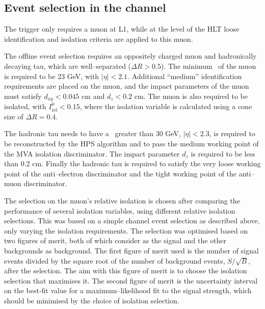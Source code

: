 \subsection{\texorpdfstring{Event selection in the \mutau channel}{Event selection in the mu tau channel}}
\label{sec:mssm_eventsel_mt}
The trigger only requires a muon at \ac{L1}, while at the level of the \ac{HLT}
loose identification and isolation criteria are applied to this muon.

The offline event selection requires an oppositely charged
muon and hadronically decaying tau, which are well--separated ($\Delta R > 0.5$).
The minimum \pT~of the muon is required to be 23 GeV, with $|\eta| < 2.1$. %
Additional ``medium'' identification requirements are placed on the muon, and the impact
parameters of the muon must satisfy $d_{xy}<0.045$ cm and $d_{z}<0.2$ cm. The muon is also
required to be isolated, with $I_{\text{rel}}^{\mu}<0.15$, where the isolation variable
is calculated using a cone size of $\Delta R = 0.4$.

The hadronic tau needs to have a \pT~greater than 30 GeV, $|\eta|<2.3$,
is required to be reconstructed by the HPS algorithm and to pass the medium
working point of the MVA isolation discriminator. The impact parameter $d_{z}$ is
required to be less than 0.2 cm. Finally the hadronic tau is required
to satisfy the very loose working point of the anti--electron discriminator
and the tight working point of the anti--muon discriminator.

The selection on the muon's relative isolation is chosen after comparing
the performance of several isolation variables, using different relative isolation selections.
This was based on a simple \mutau channel
event selection as described above, only varying the isolation requirements.
The selection was optimised based on two figures of merit, both of
which consider \Ztautau as the signal and the other backgrounds
as background. The first figure of merit used is the number of signal events divided by the
square root of the number of background events, $S/\sqrt{B}$, after
the selection. The aim with this figure of merit is to choose
the isolation selection that maximises it. The second figure of merit
is the uncertainty interval on the best-fit value for a maximum--likelihood fit
to the \Ztautau signal strength, which should be minimised by the choice of
isolation selection.

